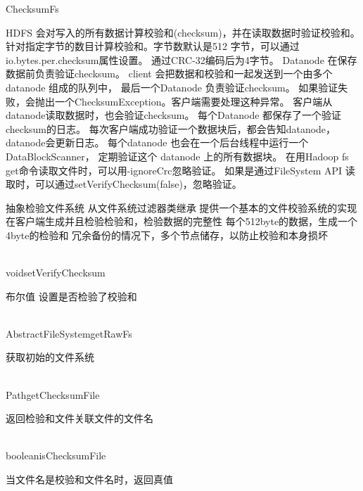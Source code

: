 \begin{XeClass}{ChecksumFs}
   
 HDFS 会对写入的所有数据计算校验和(checksum)，并在读取数据时验证校验和。
 针对指定字节的数目计算校验和。字节数默认是512 字节，可以通过io.bytes.per.checksum属性设置。
 通过CRC-32编码后为4字节。
 Datanode 在保存数据前负责验证checksum。
 client 会把数据和校验和一起发送到一个由多个datanode 组成的队列中，
 最后一个Datanode 负责验证checksum。
 如果验证失败，会抛出一个ChecksumException。客户端需要处理这种异常。
 客户端从datanode读取数据时，也会验证checksum。
 每个Datanode 都保存了一个验证checksum的日志。
 每次客户端成功验证一个数据块后，都会告知datanode，datanode会更新日志。
 每个datanode 也会在一个后台线程中运行一个DataBlockScanner，
 定期验证这个 datanode 上的所有数据块。
 在用Hadoop fs get命令读取文件时，可以用-ignoreCrc忽略验证。
 如果是通过FileSystem API 读取时，可以通过setVerifyChecksum(false)，忽略验证。
 
 抽象检验文件系统 从文件系统过滤器类继承
 提供一个基本的文件校验系统的实现
 在客户端生成并且检验检验和，检验数据的完整性
 每个512byte的数据，生成一个4byte的检验和
 冗余备份的情况下，多个节点储存，以防止校验和本身损坏

  \begin{XeMethod}{\XePublic\\ }{void}{setVerifyChecksum}
       
 布尔值 设置是否检验了校验和

  \end{XeMethod}

  \begin{XeMethod}{\XePublic\\ }{AbstractFileSystem}{getRawFs}
       
 获取初始的文件系统

  \end{XeMethod}

  \begin{XeMethod}{\XePublic\\ }{Path}{getChecksumFile}
       
 返回检验和文件关联文件的文件名

  \end{XeMethod}

  \begin{XeMethod}{\XePublic\\ }{boolean}{isChecksumFile}
       
 当文件名是校验和文件名时，返回真值


\end{XeMethod}
\end{XeClass}
